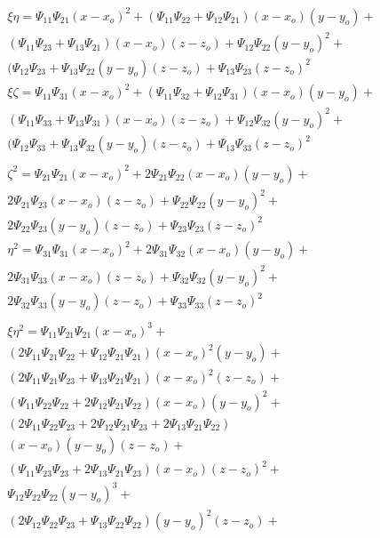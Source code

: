 \begin{equation}
    \label{eq:a16}
    \begin{gathered}
    \xi\eta=\Psi_{11}\Psi_{21}(x-x_o)^2+(\Psi_{11}\Psi_{22}+\Psi_{12}\Psi_{21})(x-x_o)(y-y_o)+\\
    (\Psi_{11}\Psi_{23}+\Psi_{13}\Psi_{21})(x-x_o)(z-z_o)+\Psi_{12}\Psi_{22}(y-y_o)^2+\\
    (\Psi_{12}\Psi_{23}+\Psi_{13}\Psi_{22}(y-y_o)(z-z_o)+\Psi_{13}\Psi_{23}(z-z_o)^2\\
    \xi\zeta=\Psi_{11}\Psi_{31}(x-x_o)^2+(\Psi_{11}\Psi_{32}+\Psi_{12}\Psi_{31})(x-x_o)(y-y_o)+\\
    (\Psi_{11}\Psi_{33}+\Psi_{13}\Psi_{31})(x-x_o)(z-z_o)+\Psi_{12}\Psi_{32}(y-y_o)^2+\\
    (\Psi_{12}\Psi_{33}+\Psi_{13}\Psi_{32}(y-y_o)(z-z_o)+\Psi_{13}\Psi_{33}(z-z_o)^2\\
    \\
    \zeta^2=\Psi_{21}\Psi_{21}(x-x_o)^2+2\Psi_{21}\Psi_{22}(x-x_o)(y-y_o)+\\
    2\Psi_{21}\Psi_{23}(x-x_o)(z-z_o)+\Psi_{22}\Psi_{22}(y-y_o)^2+\\
    2\Psi_{22}\Psi_{23}(y-y_o)(z-z_o)+\Psi_{23}\Psi_{23}(z-z_o)^2\\
    \eta^2=\Psi_{31}\Psi_{31}(x-x_o)^2+2\Psi_{31}\Psi_{32}(x-x_o)(y-y_o)+\\
    2\Psi_{31}\Psi_{33}(x-x_o)(z-z_o)+\Psi_{32}\Psi_{32}(y-y_o)^2+\\
    2\Psi_{32}\Psi_{33}(y-y_o)(z-z_o)+\Psi_{33}\Psi_{33}(z-z_o)^2\\
    \\
    \xi\eta^2=\Psi_{11}\Psi_{21}\Psi_{21}(x-x_o)^3+\\
    (2\Psi_{11}\Psi_{21}\Psi_{22}+\Psi_{12}\Psi_{21}\Psi_{21})(x-x_o)^2(y-y_o)+\\
    (2\Psi_{11}\Psi_{21}\Psi_{23}+\Psi_{13}\Psi_{21}\Psi_{21})(x-x_o)^2(z-z_o)+\\
    (\Psi_{11}\Psi_{22}\Psi_{22}+2\Psi_{12}\Psi_{21}\Psi_{22})(x-x_o)(y-y_o)^2+\\
    (2\Psi_{11}\Psi_{22}\Psi_{23}+2\Psi_{12}\Psi_{21}\Psi_{23}+2\Psi_{13}\Psi_{21}\Psi_{22})\\
    (x-x_o)(y-y_o)(z-z_o)+\\
    (\Psi_{11}\Psi_{23}\Psi_{23}+2\Psi_{13}\Psi_{21}\Psi_{23})(x-x_o)(z-z_o)^2+\\
    \Psi_{12}\Psi_{22}\Psi_{22}(y-y_o)^3+\\
    (2\Psi_{12}\Psi_{22}\Psi_{23}+\Psi_{13}\Psi_{22}\Psi_{22})(y-y_o)^2(z-z_o)+\\

\end{gathered}
\end{equation}
